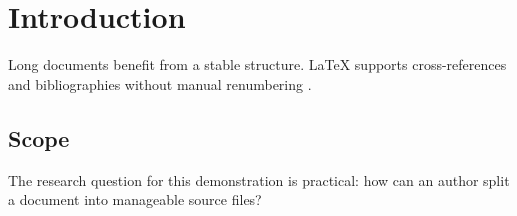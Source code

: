 \chapter{Introduction}
\label{chap:introduction}
Long documents benefit from a stable structure. LaTeX supports
cross-references and bibliographies without manual renumbering
\parencite{lamport1994}.

\section{Scope}
The research question for this demonstration is practical: how can
an author split a document into manageable source files?
